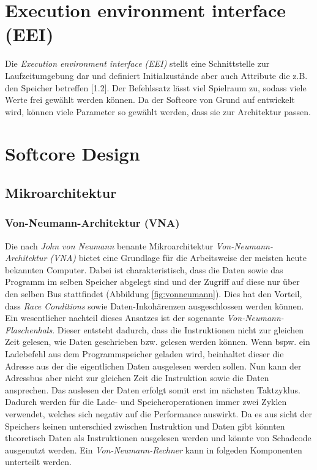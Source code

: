     \section{Execution environment interface (EEI)}\label{lab:eei}
        Die \textit{Execution environment interface (EEI)} stellt eine Schnittstelle zur Laufzeitumgebung
        dar und definiert Initialzustände aber auch Attribute die z.B. den Speicher betreffen \cite{riscv-isa-specs}[1.2].
        Der Befehlssatz lässt viel Spielraum zu, sodass viele Werte frei gewählt werden können.
        Da der Softcore von Grund auf entwickelt wird, können viele Parameter so gewählt werden, dass sie zur Architektur passen.


    \section{Softcore Design}

        \subsection{Mikroarchitektur}
                \subsubsection{Von-Neumann-Architektur (VNA)}
                    Die nach \textit{John von Neumann} benante Mikroarchitektur \textit{Von-Neumann-Architektur (VNA)}
                    bietet eine Grundlage für die Arbeitsweise der meisten heute bekannten Computer.
                    Dabei ist charakteristisch, dass die Daten sowie das Programm im selben Speicher abgelegt sind und
                    der Zugriff auf diese nur über den selben Bus stattfindet (Abbildung \ref{fig:vonneumann}).
                    Dies hat den Vorteil, dass \textit{Race Conditions} sowie Daten-Inkohärenzen ausgeschlossen werden können.
                    Ein wesentlicher nachteil dieses Ansatzes ist der sogenante \textit{Von-Neumann-Flaschenhals}.
                    Dieser entsteht dadurch, dass die Instruktionen nicht zur gleichen Zeit gelesen,
                    wie Daten geschrieben bzw. gelesen werden können. Wenn bspw. ein Ladebefehl aus dem Programmspeicher
                    geladen wird, beinhaltet dieser die Adresse aus der die eigentlichen Daten ausgelesen werden sollen.
                    Nun kann der Adressbus aber nicht zur gleichen Zeit die Instruktion sowie die Daten ansprechen.
                    Das auslesen der Daten erfolgt somit erst im nächsten Taktzyklus. Dadurch werden für
                    die Lade- und Speicheroperationen immer zwei Zyklen verwendet, welches sich
                    negativ auf die Performance auswirkt.
                    Da es aus sicht der Speichers keinen unterschied zwischen Instruktion und Daten gibt
                    könnten theoretisch Daten als Instruktionen ausgelesen werden und könnte von Schadcode ausgenutzt werden.
                    Ein \textit{Von-Neumann-Rechner} kann in folgeden Komponenten unterteilt werden.

